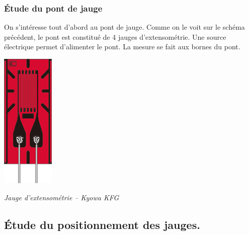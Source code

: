 \documentclass[10pt]{article}
\begin{document}
\subsubsection{Étude du pont de jauge}
\begin{minipage}[c]{.6\linewidth}

On s'intéresse tout d'abord au pont de jauge. Comme on le voit sur le schéma précédent, le pont est constitué de 4 jauges d'extensométrie. Une source électrique permet d'alimenter le pont. La mesure se fait aux bornes du pont. 

\end{minipage} \hfill
\begin{minipage}[c]{.35\linewidth}
\begin{center}
\includegraphics[width=\textwidth]{images/jauge}

\textit{Jauge d'extensométrie -- Kyowa KFG}
\end{center}
\end{minipage}


\subsection*{Étude du positionnement des jauges.}
\end{document}
